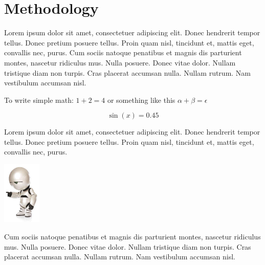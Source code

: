 \documentclass{article}
\begin{document}
\section{Methodology}
Lorem ipsum dolor sit amet, consectetuer adipiscing elit.  Donec hendrerit tempor tellus.  Donec pretium posuere tellus.  Proin quam nisl, tincidunt et, mattis eget, convallis nec, purus.  Cum sociis natoque penatibus et magnis dis parturient montes, nascetur ridiculus mus.  Nulla posuere.  Donec vitae dolor.  Nullam tristique diam non turpis.  Cras placerat accumsan nulla.  Nullam rutrum.  Nam vestibulum accumsan nisl.

To write simple math: $1 + 2 = 4$ or something like this $\alpha + \beta = \epsilon$

\begin{equation}
\sin(x) = 0.45 
\end{equation}

Lorem ipsum dolor sit amet, consectetuer adipiscing elit.  Donec hendrerit
tempor tellus.  Donec pretium posuere tellus.  Proin quam nisl, tincidunt et,
mattis eget, convallis nec, purus.  

\includegraphics[height=3cm]{marvin}

Cum sociis natoque penatibus et magnis dis parturient montes, nascetur ridiculus mus.  Nulla posuere.  Donec vitae dolor.  Nullam tristique diam non turpis.  Cras placerat accumsan nulla.  Nullam rutrum.  Nam vestibulum accumsan nisl.
\end{document}
